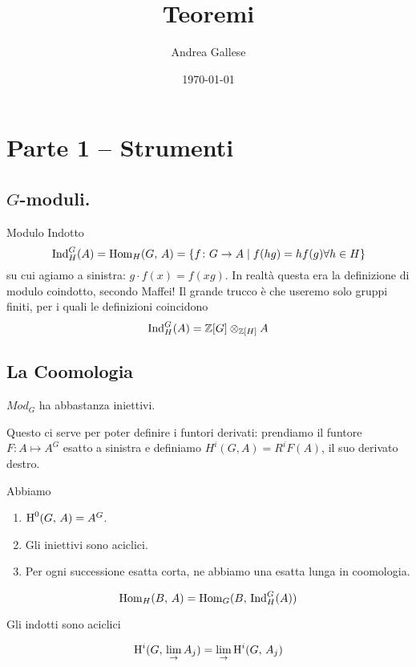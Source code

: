 \documentclass[a4paper]{article}
\title{Teoremi}\let\Title\@title
\author{Andrea Gallese}\let\Author\@author
\date{\today}\let\Date\@date
\begin{document}
	
	\section{Parte 1 -- Strumenti}
	
	\subsection{$ G $-moduli.}
	\begin{definition}{Modulo Indotto}
		\[ \operatorname{Ind}_H^G(A) = \operatorname{Hom}_H(G, \, A) = \{ f \colon G \to A \mid f(hg) = h f(g) \forall h \in H \} \]
		su cui agiamo a sinistra: $ g \cdot f(x) = f(xg) $. In realtà questa era la definizione di modulo coindotto, secondo Maffei! Il grande trucco è che useremo solo gruppi finiti, per i quali le definizioni coincidono
		\[ \operatorname{Ind}_H^G(A) = \mathbb{Z}[G] \otimes_{\mathbb{Z}[H]} A \]
	\end{definition}

	\subsection{La Coomologia}
	\begin{theorem}
		$ Mod_G $ ha abbastanza iniettivi.
	\end{theorem}

	Questo ci serve per poter definire i funtori derivati: prendiamo il funtore $ F \colon A \mapsto A^G $ esatto a sinistra e definiamo $ H^i(G, A) = R^iF(A) $, il suo derivato destro.
	
	\begin{theorem}
		Abbiamo
		\begin{enumerate}
			\item $ \operatorname{H}^0(G,\, A) = A^G $.
			\item Gli iniettivi sono aciclici.
			\item Per ogni successione esatta corta, ne abbiamo una esatta lunga in coomologia.
		\end{enumerate}
	\end{theorem}

	\begin{theorem}
		\[ \operatorname{Hom}_H(B,\, A) = \operatorname{Hom}_G(B, \, \operatorname{Ind}_H^G(A)) \]
	\end{theorem}

	\begin{theorem}
		Gli indotti sono aciclici\end{theorem}

	\begin{theorem}
		\[ \operatorname{H}^i(G, \, \lim_{\rightarrow} A_j) =  \lim_{\rightarrow}\operatorname{H}^i(G, \, A_j) \]
	\end{theorem}
\end{document}
